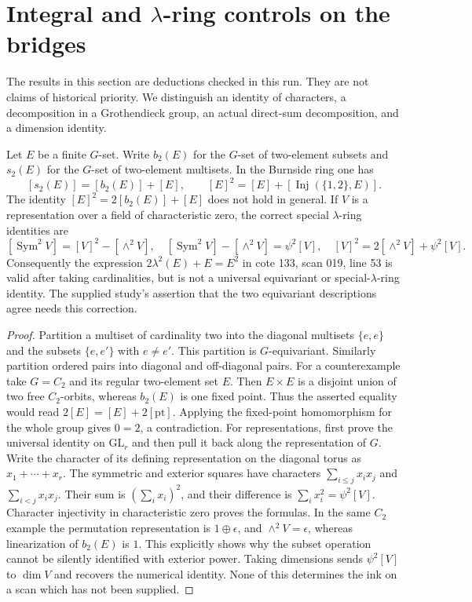\section{Integral and $\lambda$-ring controls on the bridges}\label{sec:root-findings}
The results in this section are deductions checked in this run. They are not claims of historical priority. We distinguish an identity of characters, a decomposition in a Grothendieck group, an actual direct-sum decomposition, and a dimension identity.

\begin{proposition}\label{G-01}
Let $E$ be a finite $G$-set. Write $b_2(E)$ for the $G$-set of two-element subsets and $s_2(E)$ for the $G$-set of two-element multisets. In the Burnside ring one has
\[
 [s_2(E)]=[b_2(E)]+[E],\qquad [E]^2=[E]+[\operatorname{Inj}(\{1,2\},E)].
\]
The identity $[E]^2=2[b_2(E)]+[E]$ does not hold in general. If $V$ is a representation over a field of characteristic zero, the correct special $\lambda$-ring identities are
\[
 [\operatorname{Sym}^2V]=[V]^2-[\wedge^2V],\quad
 [\operatorname{Sym}^2V]-[\wedge^2V]=\psi^2[V],\quad
 [V]^2=2[\wedge^2V]+\psi^2[V].
\]
Consequently the expression $2\lambda^2(E)+E=E^2$ in cote 133, scan 019, line 53 is valid after taking cardinalities, but is not a universal equivariant or special-$\lambda$-ring identity. The supplied study's assertion that the two equivariant descriptions agree needs this correction.
\end{proposition}
\begin{proof}
Partition a multiset of cardinality two into the diagonal multisets $\{e,e\}$ and the subsets $\{e,e'\}$ with $e\ne e'$. This partition is $G$-equivariant. Similarly partition ordered pairs into diagonal and off-diagonal pairs. For a counterexample take $G=C_2$ and its regular two-element set $E$. Then $E\times E$ is a disjoint union of two free $C_2$-orbits, whereas $b_2(E)$ is one fixed point. Thus the asserted equality would read $2[E]=[E]+2[\mathrm{pt}]$. Applying the fixed-point homomorphism for the whole group gives $0=2$, a contradiction.
For representations, first prove the universal identity on $\mathrm{GL}_r$ and then pull it back along the representation of $G$. Write the character of its defining representation on the diagonal torus as $x_1+\cdots+x_r$. The symmetric and exterior squares have characters $\sum_{i\leq j}x_ix_j$ and $\sum_{i<j}x_ix_j$. Their sum is $(\sum_i x_i)^2$, and their difference is $\sum_i x_i^2=\psi^2[V]$. Character injectivity in characteristic zero proves the formulas. In the same $C_2$ example the permutation representation is $1\oplus\epsilon$, and $\wedge^2V=\epsilon$, whereas linearization of $b_2(E)$ is $1$. This explicitly shows why the subset operation cannot be silently identified with exterior power. Taking dimensions sends $\psi^2[V]$ to $\dim V$ and recovers the numerical identity. None of this determines the ink on a scan which has not been supplied.
\end{proof}

